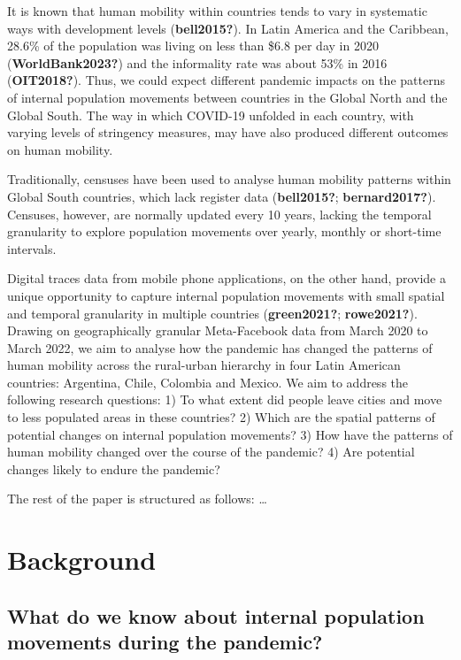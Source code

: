 \documentclass[11pt,letterpaper]{article}
\begin{document}
It is known that human mobility within countries tends to vary in
systematic ways with development levels (\textbf{bell2015?}). In Latin
America and the Caribbean, 28.6\% of the population was living on less
than \$6.8 per day in 2020 (\textbf{WorldBank2023?}) and the informality
rate was about 53\% in 2016 (\textbf{OIT2018?}). Thus, we could expect
different pandemic impacts on the patterns of internal population
movements between countries in the Global North and the Global South.
The way in which COVID-19 unfolded in each country, with varying levels
of stringency measures, may have also produced different outcomes on
human mobility.

Traditionally, censuses have been used to analyse human mobility
patterns within Global South countries, which lack register data
(\textbf{bell2015?}; \textbf{bernard2017?}). Censuses, however, are
normally updated every 10 years, lacking the temporal granularity to
explore population movements over yearly, monthly or short-time
intervals.

Digital traces data from mobile phone applications, on the other hand,
provide a unique opportunity to capture internal population movements
with small spatial and temporal granularity in multiple countries
(\textbf{green2021?}; \textbf{rowe2021?}). Drawing on geographically
granular Meta-Facebook data from March 2020 to March 2022, we aim to
analyse how the pandemic has changed the patterns of human mobility
across the rural-urban hierarchy in four Latin American countries:
Argentina, Chile, Colombia and Mexico. We aim to address the following
research questions: 1) To what extent did people leave cities and move
to less populated areas in these countries? 2) Which are the spatial
patterns of potential changes on internal population movements? 3) How
have the patterns of human mobility changed over the course of the
pandemic? 4) Are potential changes likely to endure the pandemic?

The rest of the paper is structured as follows: \ldots{}

\section{Background}

\subsection{What do we know about internal population movements during the pandemic?}
\end{document}
